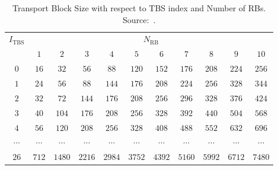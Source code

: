 \begin{table}[]
	\centering
	\caption{Transport Block Size with respect to TBS index and Number of RBs. Source:~\cite[Tab.~7.1.7.2.1-1]{lte-eutra-physical-layer}.}
	\label{tab:tbs}
	\begin{tabular}{@{}c|cccccccccc@{}}
		\toprule
		\multirow{2}{*}{$I_{\text{TBS}}$} & \multicolumn{10}{c}{$N_{\text{RB}}$}                                                                        \\ \cmidrule(l){2-11} 
		& $1$      & $2$      & $3$      & $4$      & $5$      & $6$      & $7$      & $8$      & $9$      & $10$     \\ \midrule
		$0$                               & $16$     & $32$     & $56$     & $88$     & $120$    & $152$    & $176$    & $208$    & $224$    & $256$    \\
		$1$                               & $24$     & $56$     & $88$     & $144$    & $176$    & $208$    & $224$    & $256$    & $328$    & $344$    \\
		$2$                               & $32$     & $72$     & $144$    & $176$    & $208$    & $256$    & $296$    & $328$    & $376$    & $424$    \\
		$3$                               & $40$     & $104$    & $176$    & $208$    & $256$    & $328$    & $392$    & $440$    & $504$    & $568$    \\
		$4$                               & $56$     & $120$    & $208$    & $256$    & $328$    & $408$    & $488$    & $552$    & $632$    & $696$    \\
		$\cdots$                          & $\cdots$ & $\cdots$ & $\cdots$ & $\cdots$ & $\cdots$ & $\cdots$ & $\cdots$ & $\cdots$ & $\cdots$ & $\cdots$ \\
		$26$                              & $712$    & $1480$   & $2216$   & $2984$   & $3752$   & $4392$   & $5160$   & $5992$   & $6712$   & $7480$   \\ \bottomrule
	\end{tabular}
\end{table}